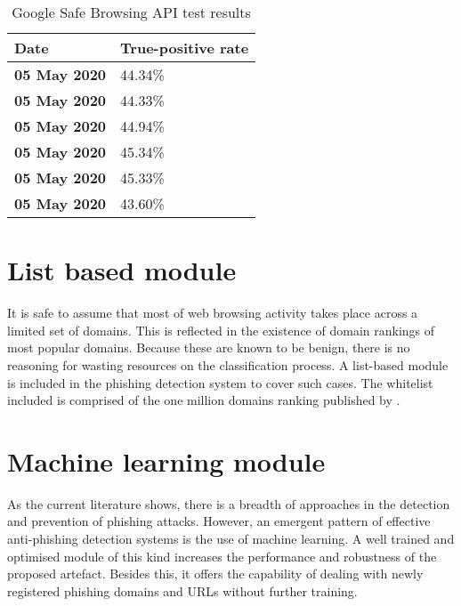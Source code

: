\begin{singlespace}
	\small
	\begin{table}
		\begin{center}
			\begin{tabular}{ | m{8em} | m{13em} | }
				\hline
				\textbf{Date}        & \textbf{True-positive rate} \\
				\hline
				\textbf{05 May 2020} & 44.34\%                     \\
				\hline
				\textbf{05 May 2020} & 44.33\%                     \\
				\hline
				\textbf{05 May 2020} & 44.94\%                     \\
				\hline
				\textbf{05 May 2020} & 45.34\%                     \\
				\hline
				\textbf{05 May 2020} & 45.33\%                     \\
				\hline
				\textbf{05 May 2020} & 43.60\%                     \\
				\hline
			\end{tabular}
			\caption{Google Safe Browsing API test results}
			\label{tab:GSBAPI_RESULTS}
		\end{center}
	\end{table}
\end{singlespace}


\section{List based module}
It is safe to assume that most of web browsing activity takes place across a limited set of domains. This is reflected in the existence of domain rankings of most popular domains. Because these are known to be benign, there is no reasoning for wasting resources on the classification process. A list-based module is included in the phishing detection system to cover such cases. The whitelist included is comprised of the one million domains ranking published by \cite{Majestic}.

\section{Machine learning module}
As the current literature shows, there is a breadth of approaches in the detection and prevention of phishing attacks. However, an emergent pattern of effective anti-phishing detection systems is the use of machine learning. A well trained and optimised module of this kind increases the performance and robustness of the proposed artefact. Besides this, it offers the capability of dealing with newly registered phishing domains and URLs without further training.

